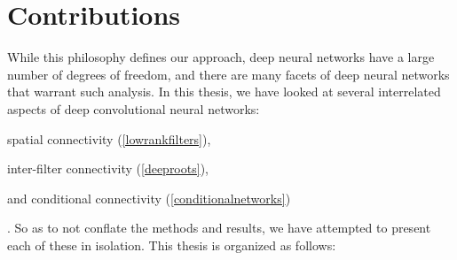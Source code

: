 \documentclass[thesis]{subfiles}
\begin{document}
\section{Contributions}
While this philosophy defines our approach, deep neural networks have a large number of degrees of freedom, and there are many facets of deep neural networks that warrant such analysis. In this thesis, we have looked at several interrelated aspects of deep convolutional neural networks:
\begin{enumerate*}[label=(\textbf{\roman*)}]
\item spatial connectivity (\cref{lowrankfilters}),
\item inter-filter connectivity (\cref{deeproots}),
\item and conditional connectivity (\cref{conditionalnetworks})
\end{enumerate*}.
So as to not conflate the methods and results, we have attempted to present each of these in isolation. 
This thesis is organized as follows:
\end{document}
